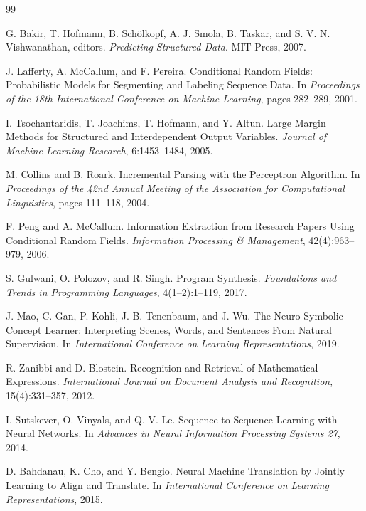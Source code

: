 \documentclass[12pt]{article}
\begin{document}
\begin{thebibliography}{99}

G. Bakir, T. Hofmann, B. Sch\"olkopf, A. J. Smola, B. Taskar, and S. V. N. Vishwanathan, editors.
\newblock \textit{Predicting Structured Data}.
\newblock MIT Press, 2007.

J. Lafferty, A. McCallum, and F. Pereira.
\newblock Conditional Random Fields: Probabilistic Models for Segmenting and Labeling Sequence Data.
\newblock In \textit{Proceedings of the 18th International Conference on Machine Learning}, pages 282--289, 2001.

I. Tsochantaridis, T. Joachims, T. Hofmann, and Y. Altun.
\newblock Large Margin Methods for Structured and Interdependent Output Variables.
\newblock \textit{Journal of Machine Learning Research}, 6:1453--1484, 2005.

M. Collins and B. Roark.
\newblock Incremental Parsing with the Perceptron Algorithm.
\newblock In \textit{Proceedings of the 42nd Annual Meeting of the Association for Computational Linguistics}, pages 111--118, 2004.

F. Peng and A. McCallum.
\newblock Information Extraction from Research Papers Using Conditional Random Fields.
\newblock \textit{Information Processing \& Management}, 42(4):963--979, 2006.

S. Gulwani, O. Polozov, and R. Singh.
\newblock Program Synthesis.
\newblock \textit{Foundations and Trends in Programming Languages}, 4(1--2):1--119, 2017.

J. Mao, C. Gan, P. Kohli, J. B. Tenenbaum, and J. Wu.
\newblock The Neuro-Symbolic Concept Learner: Interpreting Scenes, Words, and Sentences From Natural Supervision.
\newblock In \textit{International Conference on Learning Representations}, 2019.

R. Zanibbi and D. Blostein.
\newblock Recognition and Retrieval of Mathematical Expressions.
\newblock \textit{International Journal on Document Analysis and Recognition}, 15(4):331--357, 2012.

I. Sutskever, O. Vinyals, and Q. V. Le.
\newblock Sequence to Sequence Learning with Neural Networks.
\newblock In \textit{Advances in Neural Information Processing Systems 27}, 2014.

D. Bahdanau, K. Cho, and Y. Bengio.
\newblock Neural Machine Translation by Jointly Learning to Align and Translate.
\newblock In \textit{International Conference on Learning Representations}, 2015.


\end{thebibliography}
\end{document}
